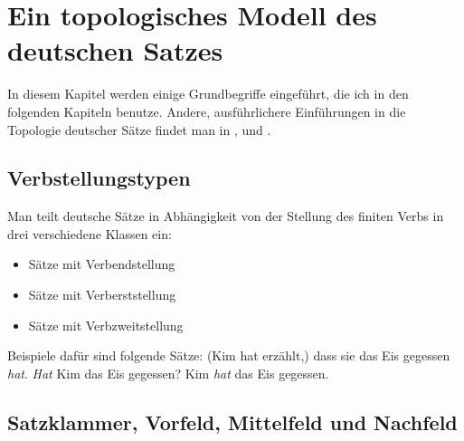 

\chapter{Ein topologisches Modell des deutschen Satzes}
\label{topo}

%
In diesem Kapitel werden einige Grundbegriffe eingeführt, die ich in den folgenden
Kapiteln benutze. 
Andere, ausführlichere Einführungen in die Topologie deutscher Sätze
findet man in ,  und .

\section{Verbstellungstypen}

Man teilt deutsche Sätze in Abhängigkeit von der Stellung des finiten Verbs 
in drei verschiedene Klassen ein:
\begin{itemize}
\item Sätze mit Verbendstellung
\item Sätze mit Verberststellung
\item Sätze mit Verbzweitstellung
\end{itemize}
Beispiele dafür sind folgende Sätze:
\eal
\ex (Kim hat erzählt,) dass sie das Eis gegessen \emph{hat}.
\ex \emph{Hat} Kim das Eis gegessen?
\ex Kim \emph{hat} das Eis gegessen.
\zl

% 
%



\section{Satzklammer, Vorfeld, Mittelfeld und Nachfeld}

